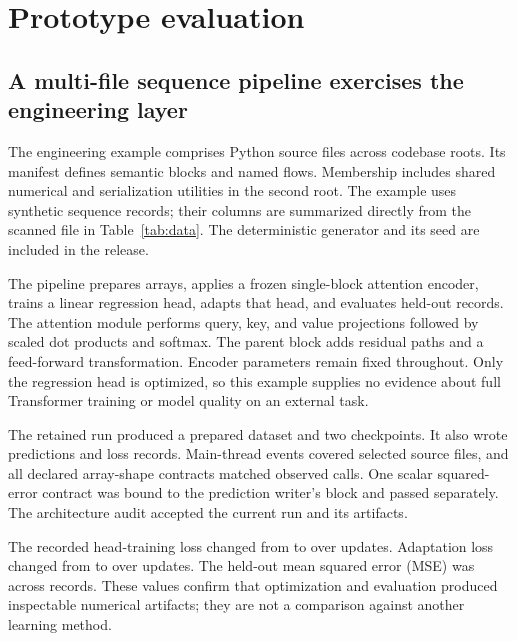 \section{Prototype evaluation}
\label{sec:experiments}

\subsection{A multi-file sequence pipeline exercises the engineering layer}
The engineering example comprises \EngineeringFiles{} Python source files across \EngineeringCodebases{} codebase roots. Its manifest defines \EngineeringBlocks{} semantic blocks and \EngineeringFlows{} named flows. Membership includes shared numerical and serialization utilities in the second root. The example uses \DatasetRows{} synthetic sequence records; their \DatasetColumns{} columns are summarized directly from the scanned file in Table~\ref{tab:data}. The deterministic generator and its seed are included in the release.

The pipeline prepares arrays, applies a frozen single-block attention encoder, trains a linear regression head, adapts that head, and evaluates held-out records. The attention module performs query, key, and value projections followed by scaled dot products and softmax. The parent block adds residual paths and a feed-forward transformation. Encoder parameters remain fixed throughout. Only the regression head is optimized, so this example supplies no evidence about full Transformer training or model quality on an external task.

The retained run produced a prepared dataset and two checkpoints. It also wrote predictions and loss records. Main-thread events covered \ObservedFiles{} selected source files, and all \ShapeContracts{} declared array-shape contracts matched observed calls. One scalar squared-error contract was bound to the prediction writer's block and passed separately. The architecture audit accepted the current run and its artifacts.

The recorded head-training loss changed from \TrainingInitial{} to \TrainingFinal{} over \TrainingSteps{} updates. Adaptation loss changed from \AdaptationInitial{} to \AdaptationFinal{} over \AdaptationSteps{} updates. The held-out mean squared error (MSE) was \ValidationMSE{} across \ValidationSamples{} records. These values confirm that optimization and evaluation produced inspectable numerical artifacts; they are not a comparison against another learning method.

